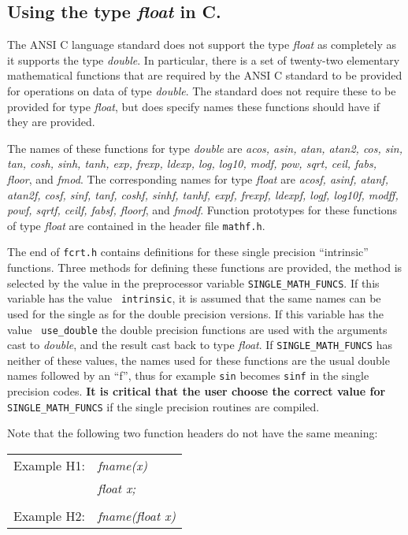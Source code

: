\documentclass[twoside]{MATH77}
\begin{document}
\subsection{Using the type {\em float} in C.\label{caution_float}}

The ANSI C language standard does not support the type {\em float}
as completely as it supports the type {\em double}.  In particular, there
is a set of twenty-two elementary mathematical functions that are
required by the ANSI C standard to be provided for operations on data
of type {\em double}.  The standard does not require these to be provided
for type {\em float}, but does specify names these functions should have
if they are provided.

The names of these functions for type {\em double} are {\em acos, asin, atan,
atan2, cos, sin, tan, cosh, sinh, tanh, exp, frexp, ldexp, log, log10,
modf, pow, sqrt, ceil, fabs, floor}, and {\em fmod}.  The corresponding names
for type {\em float} are {\em acosf, asinf, atanf,
atan2f, cosf, sinf, tanf, coshf, sinhf, tanhf,
expf, frexpf, ldexpf, logf, log10f,
modff, powf, sqrtf, ceilf, fabsf, floorf}, and {\em fmodf}.
Function prototypes for these functions of type {\em float} are
contained in the header file {\tt mathf.h}.

The end of {\tt fcrt.h} contains definitions for these single precision
``intrinsic'' functions.  Three methods for defining these functions are
provided, the method is selected by the value in the preprocessor variable
{\tt SINGLE\_MATH\_FUNCS}.  If this variable has the value {\tt
intrinsic}, it is assumed that the same names can be used for the single
as for the double precision versions.  If this variable has the value {\tt
use\_double} the double precision functions are used with the arguments
cast to {\em double}, and the result cast back to type {\em float}.  If
{\tt SINGLE\_MATH\_FUNCS} has neither of these values, the names used for
these functions are the usual double names followed by an ``f'', thus for
example {\tt sin} becomes {\tt sinf} in the single precision codes.
{\large \bf It is critical that the user choose the correct value for}
{\tt SINGLE\_MATH\_FUNCS} if the single precision routines are compiled.

Note that the following two function headers do not have the same meaning:

\begin{tabular}{ll}
Example H1: & {\em fname(x)}\\
& {\em float x;}\\
\\
Example H2: & {\em fname(float x)}
\end{tabular}
\end{document}
